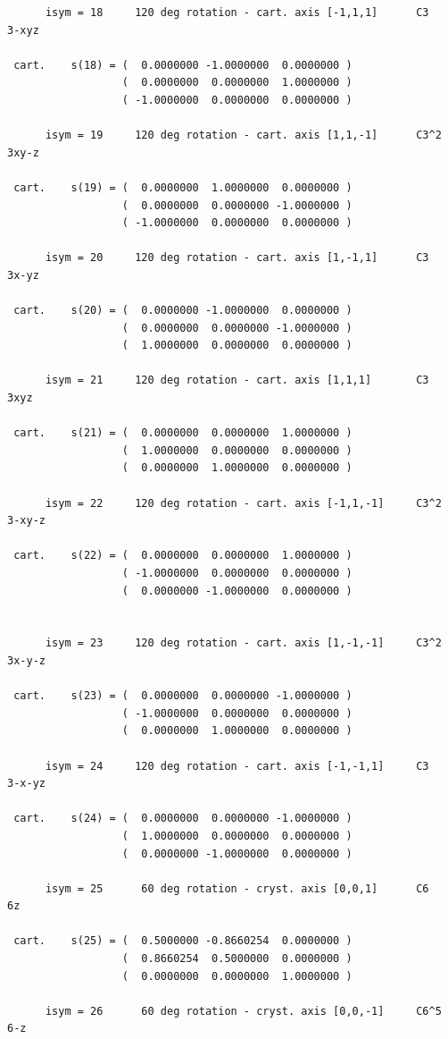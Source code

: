 \documentclass[12pt,a4paper]{article}
\begin{document}
\begin{verbatim}
      isym = 18     120 deg rotation - cart. axis [-1,1,1]      C3     3-xyz

 cart.    s(18) = (  0.0000000 -1.0000000  0.0000000 )
                  (  0.0000000  0.0000000  1.0000000 )
                  ( -1.0000000  0.0000000  0.0000000 )

      isym = 19     120 deg rotation - cart. axis [1,1,-1]      C3^2   3xy-z

 cart.    s(19) = (  0.0000000  1.0000000  0.0000000 )
                  (  0.0000000  0.0000000 -1.0000000 )
                  ( -1.0000000  0.0000000  0.0000000 )

      isym = 20     120 deg rotation - cart. axis [1,-1,1]      C3     3x-yz

 cart.    s(20) = (  0.0000000 -1.0000000  0.0000000 )
                  (  0.0000000  0.0000000 -1.0000000 )
                  (  1.0000000  0.0000000  0.0000000 )

      isym = 21     120 deg rotation - cart. axis [1,1,1]       C3     3xyz

 cart.    s(21) = (  0.0000000  0.0000000  1.0000000 )
                  (  1.0000000  0.0000000  0.0000000 )
                  (  0.0000000  1.0000000  0.0000000 )

      isym = 22     120 deg rotation - cart. axis [-1,1,-1]     C3^2   3-xy-z

 cart.    s(22) = (  0.0000000  0.0000000  1.0000000 )
                  ( -1.0000000  0.0000000  0.0000000 )
                  (  0.0000000 -1.0000000  0.0000000 )


      isym = 23     120 deg rotation - cart. axis [1,-1,-1]     C3^2   3x-y-z

 cart.    s(23) = (  0.0000000  0.0000000 -1.0000000 )
                  ( -1.0000000  0.0000000  0.0000000 )
                  (  0.0000000  1.0000000  0.0000000 )

      isym = 24     120 deg rotation - cart. axis [-1,-1,1]     C3     3-x-yz

 cart.    s(24) = (  0.0000000  0.0000000 -1.0000000 )
                  (  1.0000000  0.0000000  0.0000000 )
                  (  0.0000000 -1.0000000  0.0000000 )

      isym = 25      60 deg rotation - cryst. axis [0,0,1]      C6     6z

 cart.    s(25) = (  0.5000000 -0.8660254  0.0000000 )
                  (  0.8660254  0.5000000  0.0000000 )
                  (  0.0000000  0.0000000  1.0000000 )

      isym = 26      60 deg rotation - cryst. axis [0,0,-1]     C6^5   6-z


\end{verbatim}
\end{document}
